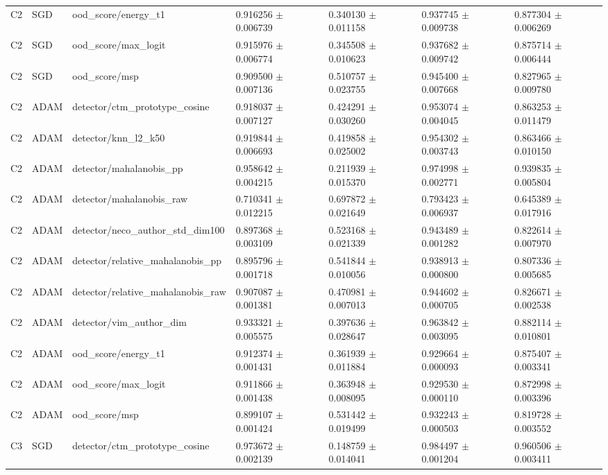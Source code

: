 \begin{longtable}{lllllll}
C2 & SGD & ood\_score/energy\_t1 & 0.916256 $\pm$ 0.006739 & 0.340130 $\pm$ 0.011158 & 0.937745 $\pm$ 0.009738 & 0.877304 $\pm$ 0.006269 \\
C2 & SGD & ood\_score/max\_logit & 0.915976 $\pm$ 0.006774 & 0.345508 $\pm$ 0.010623 & 0.937682 $\pm$ 0.009742 & 0.875714 $\pm$ 0.006444 \\
C2 & SGD & ood\_score/msp & 0.909500 $\pm$ 0.007136 & 0.510757 $\pm$ 0.023755 & 0.945400 $\pm$ 0.007668 & 0.827965 $\pm$ 0.009780 \\
C2 & ADAM & detector/ctm\_prototype\_cosine & 0.918037 $\pm$ 0.007127 & 0.424291 $\pm$ 0.030260 & 0.953074 $\pm$ 0.004045 & 0.863253 $\pm$ 0.011479 \\
C2 & ADAM & detector/knn\_l2\_k50 & 0.919844 $\pm$ 0.006693 & 0.419858 $\pm$ 0.025002 & 0.954302 $\pm$ 0.003743 & 0.863466 $\pm$ 0.010150 \\
C2 & ADAM & detector/mahalanobis\_pp & 0.958642 $\pm$ 0.004215 & 0.211939 $\pm$ 0.015370 & 0.974998 $\pm$ 0.002771 & 0.939835 $\pm$ 0.005804 \\
C2 & ADAM & detector/mahalanobis\_raw & 0.710341 $\pm$ 0.012215 & 0.697872 $\pm$ 0.021649 & 0.793423 $\pm$ 0.006937 & 0.645389 $\pm$ 0.017916 \\
C2 & ADAM & detector/neco\_author\_std\_dim100 & 0.897368 $\pm$ 0.003109 & 0.523168 $\pm$ 0.021339 & 0.943489 $\pm$ 0.001282 & 0.822614 $\pm$ 0.007970 \\
C2 & ADAM & detector/relative\_mahalanobis\_pp & 0.895796 $\pm$ 0.001718 & 0.541844 $\pm$ 0.010056 & 0.938913 $\pm$ 0.000800 & 0.807336 $\pm$ 0.005685 \\
C2 & ADAM & detector/relative\_mahalanobis\_raw & 0.907087 $\pm$ 0.001381 & 0.470981 $\pm$ 0.007013 & 0.944602 $\pm$ 0.000705 & 0.826671 $\pm$ 0.002538 \\
C2 & ADAM & detector/vim\_author\_dim & 0.933321 $\pm$ 0.005575 & 0.397636 $\pm$ 0.028647 & 0.963842 $\pm$ 0.003095 & 0.882114 $\pm$ 0.010801 \\
C2 & ADAM & ood\_score/energy\_t1 & 0.912374 $\pm$ 0.001431 & 0.361939 $\pm$ 0.011884 & 0.929664 $\pm$ 0.000093 & 0.875407 $\pm$ 0.003341 \\
C2 & ADAM & ood\_score/max\_logit & 0.911866 $\pm$ 0.001438 & 0.363948 $\pm$ 0.008095 & 0.929530 $\pm$ 0.000110 & 0.872998 $\pm$ 0.003396 \\
C2 & ADAM & ood\_score/msp & 0.899107 $\pm$ 0.001424 & 0.531442 $\pm$ 0.019499 & 0.932243 $\pm$ 0.000503 & 0.819728 $\pm$ 0.003552 \\
C3 & SGD & detector/ctm\_prototype\_cosine & 0.973672 $\pm$ 0.002139 & 0.148759 $\pm$ 0.014041 & 0.984497 $\pm$ 0.001204 & 0.960506 $\pm$ 0.003411 \\

\end{longtable}
